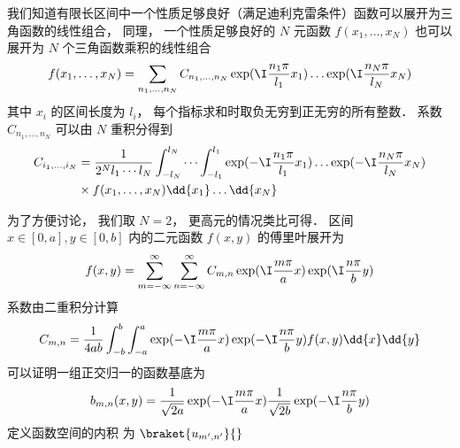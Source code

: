 

我们知道有限长区间中一个性质足够良好（满足迪利克雷条件）函数可以展开为三角函数的线性组合， 同理， 一个性质足够良好的 $N$ 元函数 $f(x_1, \dots, x_N)$ 也可以展开为 $N$ 个三角函数乘积的线性组合
\begin{equation}
f(x_1, \dots, x_N) = \sum_{n_1,\dots, n_N} C_{n_1,\dots, n_N} \exp(\I \frac{n_1\pi}{l_1} x_1) \dots \exp(\I \frac{n_N \pi}{l_N} x_N)
\end{equation}
其中 $x_i$ 的区间长度为 $l_i$， 每个指标求和时取负无穷到正无穷的所有整数． 系数 $C_{n_1,\dots, n_N}$ 可以由 $N$ 重积分得到
\begin{equation}
\begin{aligned}
C_{i_1,\dots, i_N} &= \frac{1}{2^Nl_1\cdots l_N}\int_{-l_N}^{l_N}\cdots\int_{-l_1}^{l_1} \exp(-\I \frac{n_1 \pi}{l_1} x_1) \dots \exp(-\I \frac{n_N \pi}{l_N} x_N)\\
 & \times f(x_1, \dots, x_N) \dd{x_1}\dots\dd{x_N}
\end{aligned}
\end{equation}

为了方便讨论， 我们取 $N = 2$， 更高元的情况类比可得． 区间 $x\in [0, a], y\in [0, b]$ 内的二元函数 $f(x, y)$ 的傅里叶展开为
\begin{equation}
f(x, y) = \sum_{m = -\infty}^\infty \sum_{n = -\infty}^\infty C_{m, n} \exp(\I \frac{m \pi}{a} x) \exp(\I \frac{n \pi}{b} y)
\end{equation}
系数由二重积分计算
\begin{equation}
C_{m, n} = \frac{1}{4ab}\int_{-b}^b\int_{-a}^a \exp(-\I \frac{m \pi}{a} x) \exp(-\I \frac{n \pi}{b} y) f(x, y) \dd{x} \dd{y}
\end{equation}
可以证明一组正交归一的函数基底为
\begin{equation}
b_{m,n}(x, y) = \frac{1}{\sqrt{2a}}\exp(-\I \frac{m \pi}{a} x) \frac{1}{\sqrt{2b}}\exp(-\I \frac{n \pi}{b} y)
\end{equation}
定义函数空间的内积 为 $\braket{u_{m',n'}}{}$


